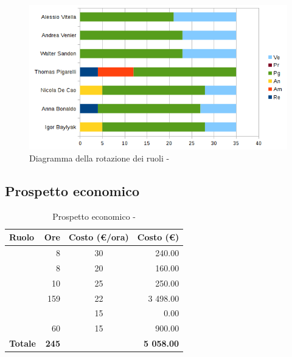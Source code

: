 \documentclass[12pt,a4paper]{article}
\begin{document}
\begin{center}
	\begin{figure}[H]
		\centering		\includegraphics[width=\textwidth]{diagrammaBarreProgettazioneArchitetturaleRotazioneRuoli.png}
		\caption{Diagramma della rotazione dei ruoli - \FPA}
	\end{figure}
\end{center}

\subsection{Prospetto economico}

\begin{table}[H]
	\begin{center}
		\begin{tabular}{l r c r}
			\toprule
			\textbf{Ruolo}	& \textbf{Ore} & \textbf{Costo (\euro/ora)}	& \textbf{Costo (\euro)} \\ \midrule
			\midrule
			\RE & 8 & 30 & 240.00 \\ \midrule
			\AM & 8 & 20 & 160.00 \\ \midrule
			\AN & 10 & 25 & 250.00 \\ \midrule
			\PG & 159 & 22 & 3 498.00 \\ \midrule
			\PR & & 15 & 0.00 \\ \midrule
			\VR & 60 & 15 & 900.00 \\ \midrule
			\textbf{Totale} & \textbf{245} &  & \textbf{5 058.00} \\
			\bottomrule
		\end{tabular}
		\caption{Prospetto economico - \FPA}
	\end{center}
\end{table}
\end{document}
